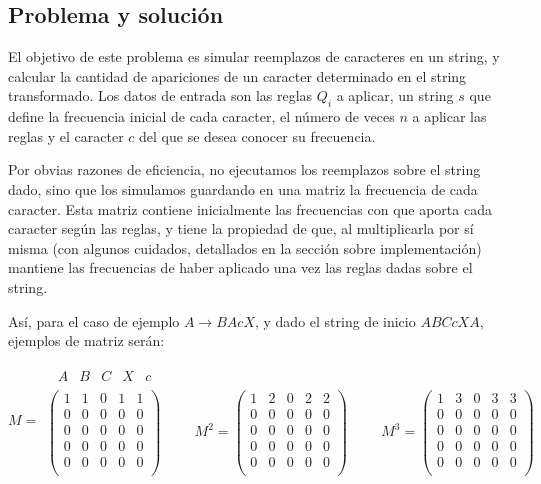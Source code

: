 \subsection*{Problema y solución}

El objetivo de este problema es simular reemplazos de caracteres en un
string, y calcular la cantidad de apariciones de un caracter determinado
en el string transformado. Los datos de entrada son las reglas $Q_i$ a aplicar,
un string $s$ que define la frecuencia inicial de cada caracter, el número de
veces $n$ a aplicar las reglas y el caracter $c$ del que se desea conocer su
frecuencia.

Por obvias razones de eficiencia, no ejecutamos los reemplazos sobre el
string dado, sino que los simulamos guardando en una matriz la frecuencia
de cada caracter. Esta matriz contiene inicialmente las frecuencias con
que aporta cada caracter según las reglas, y tiene la propiedad de que,
al multiplicarla por sí misma (con algunos cuidados, detallados en la sección
sobre implementación) mantiene las frecuencias de haber aplicado una vez las
reglas dadas sobre el string.

Así, para el caso de ejemplo $A \rightarrow BAcX$, y dado el string de inicio
$ABCcXA$, ejemplos de matriz serán:

$$M =
\begin{array}{l}
\begin{matrix}
	\ \ A & B & C & X & c
\end{matrix} \\
\left(
	\begin{array}{ccccc}
	1 & 1 & 0 & 1 & 1 \\
	0 & 0 & 0 & 0 & 0 \\
	0 & 0 & 0 & 0 & 0 \\
	0 & 0 & 0 & 0 & 0 \\
	0 & 0 & 0 & 0 & 0 \\
	\end{array}
\right)
\hspace{1cm}
M^2 = \left(
\begin{array}{ccccc}
1 & 2 & 0 & 2 & 2 \\
0 & 0 & 0 & 0 & 0 \\
0 & 0 & 0 & 0 & 0 \\
0 & 0 & 0 & 0 & 0 \\
0 & 0 & 0 & 0 & 0 \\
\end{array}
\right)
\hspace{1cm}
M^3 = \left(
\begin{array}{ccccc}
1 & 3 & 0 & 3 & 3 \\
0 & 0 & 0 & 0 & 0 \\
0 & 0 & 0 & 0 & 0 \\
0 & 0 & 0 & 0 & 0 \\
0 & 0 & 0 & 0 & 0 \\
\end{array}
\right)
\end{array}
$$

